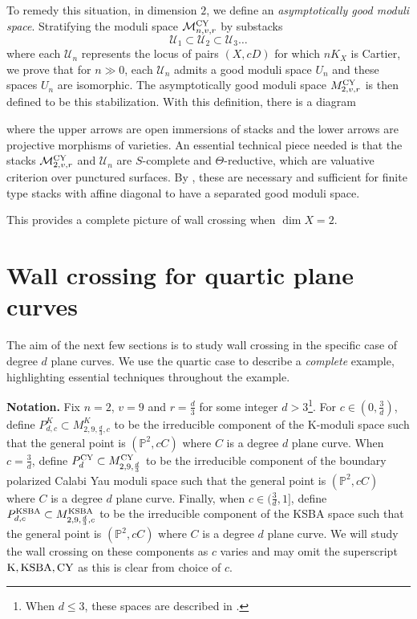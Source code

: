 \documentclass[11pt]{amsart}
\numberwithin{equation}{section}
\theoremstyle{definition}
\newcommand{\KSBA}{{\rm KSBA}}
\newcommand{\bP}{\mathbb{P}}
\newcommand{\calU}{\mathcal{U}}
\newcommand{\cU}{\mathcal{U}}
\newcommand{\cM}{\mathcal M}
\newcommand{\K}{\mathrm{K}}
\begin{document}
To remedy this situation, in dimension $2$, we define an \textit{asymptotically good moduli space}.  Stratifying the moduli space $\cM^{\rm CY}_{n,v,r}$ by substacks 
\[ \calU_1 \subset \calU_2 \subset \calU_3 \dots \]
where each $\calU_n$ represents the locus of pairs $(X,cD)$ for which $nK_X$ is Cartier, we prove that for $n \gg 0 $, each $\calU_n$ admits a good moduli space $U_n$ and these spaces $U_n$ are isomorphic.  The asymptotically good moduli space $M^{\rm CY}_{2,v,r}$ is then defined to be this stabilization.  With this definition, there is a diagram 

\begin{center}
\end{center}
where the upper arrows are open immersions of stacks and the lower arrows are projective morphisms of varieties.  An essential technical piece needed is that the stacks $\cM^{\rm CY}_{2,v,r}$ and $\cU_n$ are $S$-complete and $\Theta$-reductive, which are valuative criterion over punctured surfaces.  By \cite{AHLH18}, these are necessary and sufficient for finite type stacks with affine diagonal to have a separated good moduli space. 


This provides a complete picture of wall crossing when $\dim X = 2$.


\section{Wall crossing for quartic plane curves}\label{sec:quartics}

The aim of the next few sections is to study wall crossing in the specific case of degree $d$ plane curves.  We use the quartic case to describe a \textit{complete} example, highlighting essential techniques throughout the example. 

\noindent \textbf{Notation.}  Fix $n = 2$, $v = 9$ and $r = \frac{d}{3}$ for some integer $d > 3$\footnote{When $d \le 3$, these spaces are described in \cite{ADLpub, BABWILD}.}.  For $c \in (0, \frac{3}{d})$, define $P^K_{d,c} \subset M^K_{2,9, \frac{d}{3},c}$ to be the irreducible component of the K-moduli space such that the general point is $(\bP^2, cC)$ where $C$ is a degree $d$ plane curve.  When $c = \frac{3}{d}$, define $P^{\rm CY}_{d} \subset M^{\rm CY}_{2,9, \frac{d}{3}}$ to be the irreducible component of the boundary polarized Calabi Yau moduli space such that the general point is $(\bP^2, cC)$ where $C$ is a degree $d$ plane curve.  Finally, when $c \in (\frac{3}{d}, 1]$, define $P^\KSBA_{d,c} \subset M^\KSBA_{2,9, \frac{d}{3},c}$ to be the irreducible component of the KSBA space such that the general point is $(\bP^2, cC)$ where $C$ is a degree $d$ plane curve.  We will study the wall crossing on these components as $c$ varies and may omit the superscript $\K, \KSBA, \rm CY$ as this is clear from choice of $c$.  
\end{document}
